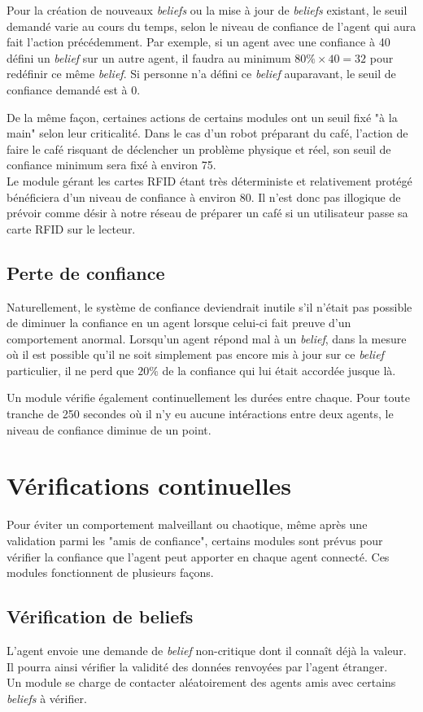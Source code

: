 \documentclass[11pt]{book}
\begin{document}
Pour la création de nouveaux \textit{beliefs} ou la mise à jour de 
\textit{beliefs} existant, le seuil demandé varie au cours du temps, selon le 
niveau de confiance de l'agent qui aura fait l'action précédemment. Par 
exemple, si un agent avec une confiance à 40 défini un \textit{belief} sur 
un autre agent, il faudra au minimum $80 \% \times 40 = 32$ pour redéfinir ce 
même \textit{belief}. Si personne n'a défini ce \textit{belief} auparavant, 
le seuil de confiance demandé est à $0$.

De la même façon, certaines actions de certains modules ont un seuil fixé "à 
la main" selon leur criticalité. Dans le cas d'un robot préparant du café, 
l'action de faire le café risquant de déclencher un problème physique et 
réel, son seuil de confiance minimum sera fixé à environ 75. \\
Le module gérant les cartes RFID étant très déterministe et relativement 
protégé bénéficiera d'un niveau de confiance à environ 80. Il n'est donc pas 
illogique de prévoir comme désir à notre réseau de préparer un café si un 
utilisateur passe sa carte RFID sur le lecteur.

\subsection{Perte de confiance}
Naturellement, le système de confiance deviendrait inutile s'il n'était pas 
possible de diminuer la confiance en un agent lorsque celui-ci fait preuve
d'un comportement anormal. Lorsqu'un agent répond mal à un \textit{belief}, 
dans la mesure où il est possible qu'il ne soit simplement pas encore mis à 
jour sur ce \textit{belief} particulier, il ne perd que $20 \%$ de la 
confiance qui lui était accordée jusque là.

Un module vérifie également continuellement les durées entre chaque. Pour 
toute tranche de 250 secondes où il n'y eu aucune intéractions entre deux 
agents, le niveau de confiance diminue de un point. 

\section{Vérifications continuelles}
Pour éviter un comportement malveillant ou chaotique, même après une 
validation parmi les "amis de confiance", certains modules sont prévus pour 
vérifier la confiance que l'agent peut apporter en chaque agent connecté. Ces 
modules fonctionnent de plusieurs façons.

\subsection{Vérification de beliefs}
L'agent envoie une demande de \textit{belief} non-critique dont il connaît 
déjà la valeur. Il pourra ainsi vérifier la validité des données renvoyées 
par l'agent étranger. \\
Un module se charge de contacter aléatoirement des agents amis avec certains 
\textit{beliefs} à vérifier.
\end{document}
